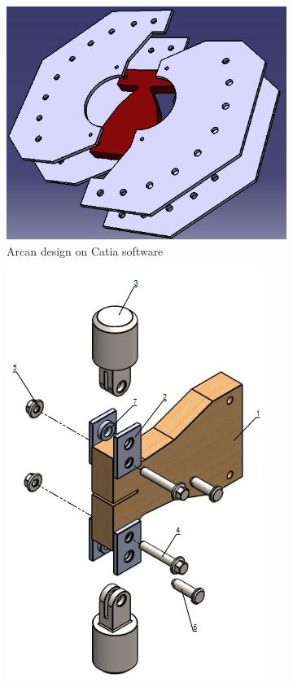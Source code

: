 \begin{figure}[h]
	\centering
	\begin{subfigure}{0.48\linewidth}
			\centering
			\includegraphics[scale=0.5]{Figures/Result}
			\decoRule
			\caption[Arcan grips]{Arcan design on Catia software}
			\label{fig:Arcan}
	\end{subfigure}
	\hfill
	\begin{subfigure}{0.48\linewidth}
		\centering
		\includegraphics[scale=0.4]{Figures/Grips_model}

\end{subfigure}
\end{figure}

